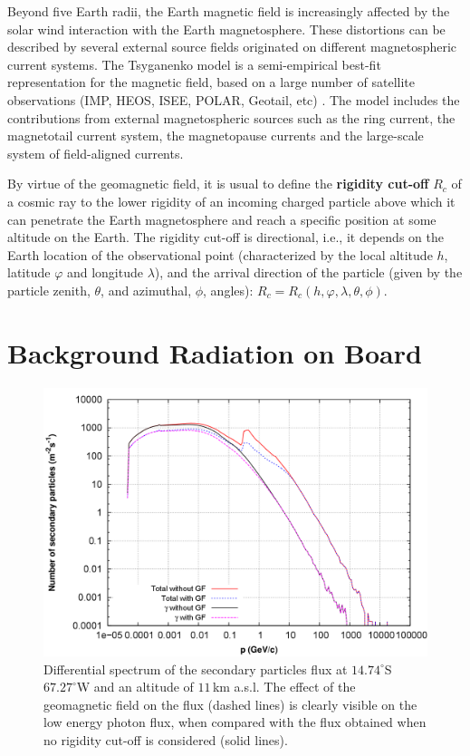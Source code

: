 \documentclass[3p,times,twocolumn]{elsarticle}
\begin{document}
Beyond five Earth radii, the Earth magnetic field is increasingly affected by
the solar wind interaction with the Earth magnetosphere. These distortions can
be described by several external source fields originated on different
magnetospheric current systems. The Tsyganenko model\cite{Tsyganenko2002} is a
semi-empirical best-fit representation for the magnetic field, based on a large
number of satellite observations (IMP, HEOS, ISEE, POLAR, Geotail, etc)
\cite{woodfield_comparison_2007}. The model includes the contributions from
external magnetospheric sources such as the ring current, the magnetotail
current system, the magnetopause currents and the large-scale system of
field-aligned currents.

By virtue of the geomagnetic field, it is usual to define the {\bf{rigidity
cut-off}} $R_c$ of a cosmic ray to the lower rigidity of an incoming charged
particle above which it can penetrate the Earth magnetosphere and reach a
specific position at some altitude on the Earth. The rigidity cut-off is
directional, i.e., it depends on the Earth location of the observational point
(characterized by the local altitude $h$, latitude $\varphi$ and longitude
$\lambda$), and the arrival direction of the particle (given by the particle
zenith, $\theta$, and azimuthal, $\phi$, angles): $R_c=R_c(h, \varphi, \lambda,
\theta, \phi)$.

\section{Background Radiation on Board}\label{sec:strategy}

\begin{figure}[t!]
\centering
\includegraphics[scale=.14]{figures/g2_efectogeo.png}
\caption{Differential spectrum of the secondary particles flux at
$14.74^\circ$S $67.27^\circ$W and an altitude of $11$\,km a.s.l. The effect of
the geomagnetic field on the flux (dashed lines) is clearly visible on the
low energy photon flux, when compared with the flux obtained when no rigidity
cut-off is considered (solid lines).}\label{fig:geo_effect}
\end{figure}
\end{document}
